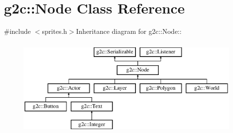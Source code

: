 \hypertarget{classg2c_1_1_node}{
\section{g2c::Node Class Reference}
\label{classg2c_1_1_node}
}


{\ttfamily \#include $<$sprites.h$>$}Inheritance diagram for g2c::Node::\begin{figure}[H]
\begin{center}
\leavevmode
\includegraphics[height=4.95575cm]{classg2c_1_1_node}
\end{center}
\end{figure}
